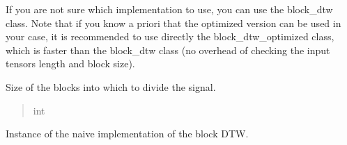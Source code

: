 \documentclass[letterpaper,10pt,english]{sphinxmanual}
\begin{document}
\begin{fulllineitems}
\sphinxAtStartPar
If you are not sure which implementation to use, you can use the block\_dtw class.
Note that if you know a priori that the optimized version can be used in your case, it is recommended to use directly the block\_dtw\_optimized class, which is faster than the block\_dtw class (no overhead of checking the input tensors length and block size).

\begin{fulllineitems}
\label{\detokenize{dtw_loss_functions.block_dtw:dtw_loss_functions.block_dtw.block_dtw.block_size}}
\pysigstartsignatures
\pysigline
{}
\pysigstopsignatures
\sphinxAtStartPar
Size of the blocks into which to divide the signal.
\begin{quote}\begin{description}
\sphinxAtStartPar
int

\end{description}\end{quote}

\end{fulllineitems}


\begin{fulllineitems}
\label{\detokenize{dtw_loss_functions.block_dtw:dtw_loss_functions.block_dtw.block_dtw.block_dtw_naive}}
\pysigstartsignatures
\pysigline
{}
\pysigstopsignatures
\sphinxAtStartPar
Instance of the naive implementation of the block DTW.
\begin{quote}\begin{description}
\sphinxAtStartPar
{\hyperref[\detokenize{dtw_loss_functions.block_dtw:dtw_loss_functions.block_dtw.block_dtw_naive}]{}}

\end{description}\end{quote}

\end{fulllineitems}



\end{fulllineitems}
\end{document}
